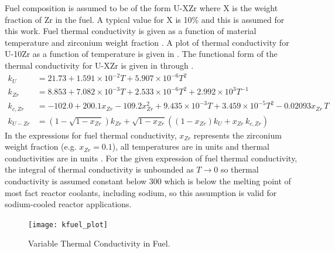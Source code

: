   Fuel composition is assumed to be of the form U-XZr where X is the weight
  fraction of Zr in the fuel. A typical value for X is 10\% and this is assumed
  for this work. Fuel thermal conductivity is given as a function of material
  temperature and zirconium weight fraction \cite{fuelProp}. A plot of thermal
  conductivity for U-10Zr as a function of temperature is given in
  . The functional form of the thermal conductivity for
  U-XZr is given in  through .
  \begin{align}
    \label{eq:kfuel_first}
    k_U      &= 21.73 + 1.591 \times 10^{-2} T + 5.907 \times 10^{-6} T^2 \\
    k_{Zr}   &= 8.853 + 7.082 \times 10^{-3} T + 2.533 \times 10^{-6} T^2 +
      2.992 \times 10^{3} T^{-1} \\
    k_{c,Zr} &= -102.0 + 200.1 x_{Zr} - 109.2 x_{Zr}^2 + 
      9.435 \times 10^{-3} T + 3.459 \times 10^{-5} T^2 - 0.02093 x_{Zr} \, T \\
    \label{eq:kfuel_last}
    k_{U-Zr} &= \left( 1 - \sqrt{1-x_{Zr}}\right) k_{Zr} + 
      \sqrt{1 - x_{Zr}} \left( \left( 1 - x_{Zr}\right) k_U + x_{Zr} \, k_{c,Zr}
      \right) 
  \end{align}
  In the expressions for fuel thermal conductivity, $x_{Zr}$ represents the
  zirconium weight fraction (e.g. $x_{Zr} = 0.1$), all temperatures are in units
   and thermal conductivities are in units
  .  For the given expression of fuel
  thermal conductivity, the integral of thermal conductivity is unbounded as $T
  \rightarrow 0$ so thermal conductivity is assumed constant below 300 
  which is below the melting point of most fact reactor coolants, including
  sodium, so this assumption is valid for sodium-cooled reactor applications.

  \begin{figure}
    \centering
    \texttt{[image: kfuel\_plot]}
    \caption{Variable Thermal Conductivity in Fuel.}
    \label{fig:kfuel_plot}
  \end{figure}

